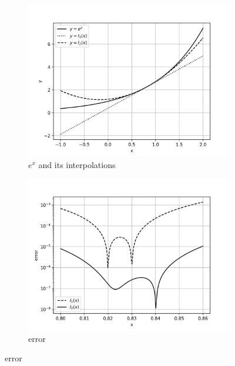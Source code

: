 \documentclass[12,a4paper]{article}
\begin{document}
    \begin{figure}[h!]
        \centering
        \begin{subfigure}[t]{0.49\textwidth}
            \includegraphics[width=\textwidth]{plots/q2a.png}
            \caption{$e^x$ and its interpolations}
            \label{fig:q2a}
        \end{subfigure}
        \begin{subfigure}[t]{0.49\textwidth}
            \includegraphics[width=\textwidth]{plots/q2b.png}
            \caption{error}
            \label{fig:q2b}
        \end{subfigure}
    \end{figure}
    
\end{document}
